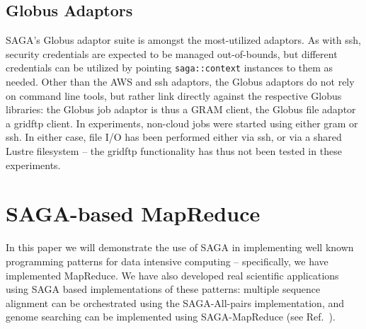 \documentclass[conference,final]{IEEEtran}
\newcommand{\jhanote}[1]{ {\textcolor{red} { ***SJ: #1 }}}
\newcommand{\jhanote}[1]{}
\newcommand{\T}[1]{\texttt{#1}}
\begin{document}

\subsection{Globus Adaptors}
SAGA's Globus adaptor suite is amongst the most-utilized adaptors.  As
with ssh, security credentials are expected to be managed
out-of-bounds, but different credentials can be utilized by pointing
\T{saga::context} instances to them as needed.  Other than the AWS and
ssh adaptors, the Globus adaptors do not rely on command line tools,
but rather link directly against the respective Globus libraries: the
Globus job adaptor is thus a GRAM client, the Globus file adaptor a
gridftp client.  In experiments, non-cloud jobs were started using
either gram or ssh.  In either case, file I/O has been performed
either via ssh, or via a shared Lustre filesystem -- the gridftp
functionality has thus not been tested in these experiments.



\section{SAGA-based MapReduce}
In this paper we will demonstrate the use of SAGA in implementing well
known programming patterns for data intensive computing --
specifically, we have implemented MapReduce. We have also developed
real scientific applications using SAGA based implementations of these
patterns: multiple sequence alignment can be orchestrated using the
SAGA-All-pairs implementation, and genome searching can be implemented
using SAGA-MapReduce (see Ref.~\cite{saga_ccgrid09}).
\end{document}
